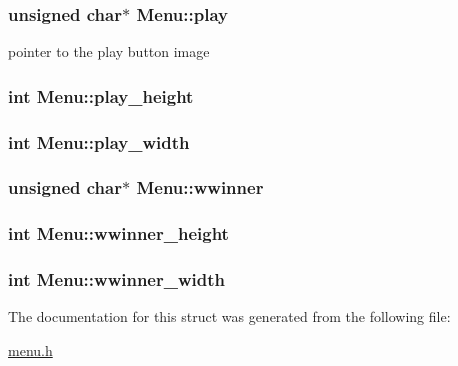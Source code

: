 \subsubsection[{\texorpdfstring{play}{play}}]{\setlength{\rightskip}{0pt plus 5cm}unsigned char$\ast$ Menu\+::play}\hypertarget{structMenu_a97c8de98a5b43b75e8a049db832427e3}{}\label{structMenu_a97c8de98a5b43b75e8a049db832427e3}
pointer to the play button image 
\subsubsection[{\texorpdfstring{play\+\_\+height}{play_height}}]{\setlength{\rightskip}{0pt plus 5cm}int Menu\+::play\+\_\+height}\hypertarget{structMenu_a88a30a9449606bab297bffab5818aad7}{}\label{structMenu_a88a30a9449606bab297bffab5818aad7}
\subsubsection[{\texorpdfstring{play\+\_\+width}{play_width}}]{\setlength{\rightskip}{0pt plus 5cm}int Menu\+::play\+\_\+width}\hypertarget{structMenu_a5ffb3bd78cd87f2d26c09b274cb33caf}{}\label{structMenu_a5ffb3bd78cd87f2d26c09b274cb33caf}
\subsubsection[{\texorpdfstring{wwinner}{wwinner}}]{\setlength{\rightskip}{0pt plus 5cm}unsigned char$\ast$ Menu\+::wwinner}\hypertarget{structMenu_aee41aa16055cd2c8ea7cb289d8011300}{}\label{structMenu_aee41aa16055cd2c8ea7cb289d8011300}
\subsubsection[{\texorpdfstring{wwinner\+\_\+height}{wwinner_height}}]{\setlength{\rightskip}{0pt plus 5cm}int Menu\+::wwinner\+\_\+height}\hypertarget{structMenu_ad6e879577aed24c8628f7041874ee244}{}\label{structMenu_ad6e879577aed24c8628f7041874ee244}
\subsubsection[{\texorpdfstring{wwinner\+\_\+width}{wwinner_width}}]{\setlength{\rightskip}{0pt plus 5cm}int Menu\+::wwinner\+\_\+width}\hypertarget{structMenu_a3b16162ce3451366bdd585c3ddcca9bb}{}\label{structMenu_a3b16162ce3451366bdd585c3ddcca9bb}


The documentation for this struct was generated from the following file\+:\begin{DoxyCompactItemize}
\item 
\hyperlink{menu_8h}{menu.\+h}\end{DoxyCompactItemize}
